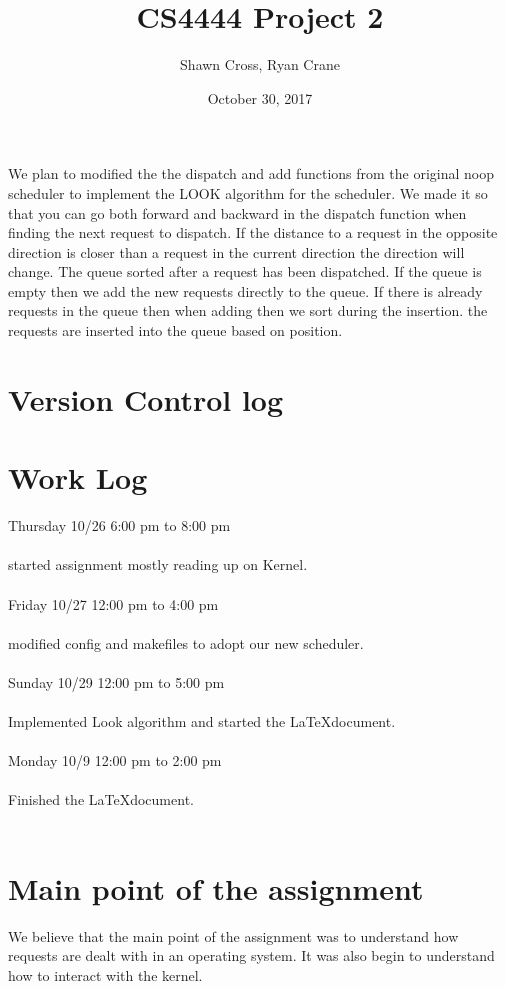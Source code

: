 \documentclass[letterpaper,10pt,titlepage]{article}
\begin{document}
\title{CS4444 Project 2}
\date{October 30, 2017}
\author{Shawn Cross, Ryan Crane}
\maketitle

We plan to modified the the dispatch and add functions from the original noop 
scheduler to implement the LOOK algorithm for the scheduler. We made it so that 
you can go both forward and backward in the dispatch function when finding the 
next request to dispatch. If the distance to a request in the opposite 
direction is closer than a request in the current direction the direction will 
change. The queue sorted after a request has been dispatched. If the queue is 
empty then we add the new requests directly to the queue. If there is already 
requests in the queue then when adding then we sort during the insertion. the 
requests are inserted into the queue based on position. 

\section{Version Control log}


\section{Work Log}
Thursday 10/26 6:00 pm to 8:00 pm\\\\
started assignment mostly reading up on Kernel.\\\\ 
Friday 10/27 12:00 pm to 4:00 pm \\\\
modified config and makefiles to adopt our new scheduler.\\\\
Sunday 10/29 12:00 pm to 5:00 pm \\\\
Implemented Look algorithm and started the \LaTeX document.\\\\
Monday 10/9 12:00 pm to 2:00 pm \\\\
Finished the \LaTeX document.\\\\

\section{Main point of the assignment}
We believe that the main point of the assignment was to understand how requests 
are dealt with in an operating system. It was also begin to understand how to 
interact with the kernel. 
\end{document}
